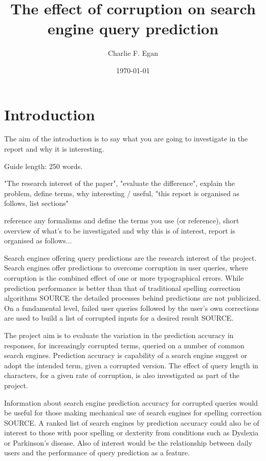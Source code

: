 \documentclass{csfourzero}
\title{The effect of corruption on search engine query prediction}
\author{Charlie F. Egan}
\date{\today}
\begin{document}
\maketitle

\section{Introduction}
\label{sec:intro}

The aim of the introduction is to say what you are going to investigate in the report and why it is interesting.

Guide length: 250 words.

"The research interest of the paper", "evaluate the difference", explain the problem, define terms, why interesting / useful, "this report is organised as follows, list sections"

reference any formalisms and define the terms you use (or reference), short overview of what's to be investigated and why this is of interest, report is organised as follows...

Search engines offering query predictions are the research interest of the project. Search engines offer predictions to overcome corruption in user queries, where corruption is the combined effect of one or more typographical errors. While prediction performance is better than that of traditional spelling correction algorithms SOURCE the detailed processes behind predictions are not publicized. On a fundamental level, failed user queries followed by the user's own corrections are used to build a list of corrupted inputs for a desired result SOURCE.

The project aim is to evaluate the variation in the prediction accuracy in responses, for increasingly corrupted terms, queried on a number of common search engines. Prediction accuracy is capability of a search engine suggest or adopt the intended term, given a corrupted version. The effect of query length in characters, for a given rate of corruption, is also investigated as part of the project.

Information about search engine prediction accuracy for corrupted queries would be useful for those making mechanical use of search engines for spelling correction SOURCE. A ranked list of search engines by prediction accuracy could also be of interest to those with poor spelling or dexterity from conditions such as Dyslexia or Parkinson's disease. Also of interest would be the relationship between daily users and the performance of query prediction as a feature.
\end{document}
